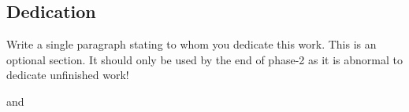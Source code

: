 \begin{center}
  \section*{Dedication}
\end{center}

\begin{spacing}{1.5}
Write a single paragraph stating to whom you dedicate this work. This is an optional section. It should only be used by the end of phase-2 as it is abnormal to dedicate unfinished work!
\end{spacing}

\begin{flushright}
  {\firststudentname} and {\secondstudentname}
\end{flushright}

\clearpage
\vspace*{2cm}